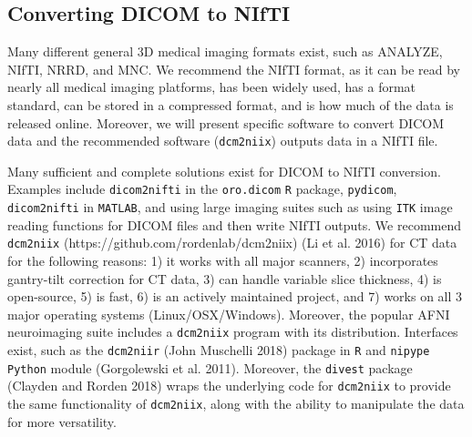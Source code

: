 \documentclass[]{elsarticle} %
\begin{document}
\hypertarget{converting-dicom-to-nifti}{%
\subsection{Converting DICOM to NIfTI}\label{converting-dicom-to-nifti}}

Many different general 3D medical imaging formats exist, such as ANALYZE, NIfTI, NRRD, and MNC. We recommend the NIfTI format, as it can be read by nearly all medical imaging platforms, has been widely used, has a format standard, can be stored in a compressed format, and is how much of the data is released online. Moreover, we will present specific software to convert DICOM data and the recommended software (\texttt{dcm2niix}) outputs data in a NIfTI file.

Many sufficient and complete solutions exist for DICOM to NIfTI conversion. Examples include \texttt{dicom2nifti} in the \texttt{oro.dicom} \texttt{R} package, \texttt{pydicom}, \texttt{dicom2nifti} in \texttt{MATLAB}, and using large imaging suites such as using \texttt{ITK} image reading functions for DICOM files and then write NIfTI outputs. We recommend \texttt{dcm2niix} (https://github.com/rordenlab/dcm2niix) (Li et al. 2016) for CT data for the following reasons: 1) it works with all major scanners, 2) incorporates gantry-tilt correction for CT data, 3) can handle variable slice thickness, 4) is open-source, 5) is fast, 6) is an actively maintained project, and 7) works on all 3 major operating systems (Linux/OSX/Windows). Moreover, the popular AFNI neuroimaging suite includes a \texttt{dcm2niix} program with its distribution. Interfaces exist, such as the \texttt{dcm2niir} (John Muschelli 2018) package in \texttt{R} and \texttt{nipype} \texttt{Python} module (Gorgolewski et al. 2011). Moreover, the \texttt{divest} package (Clayden and Rorden 2018) wraps the underlying code for \texttt{dcm2niix} to provide the same functionality of \texttt{dcm2niix}, along with the ability to manipulate the data for more versatility.
\end{document}
